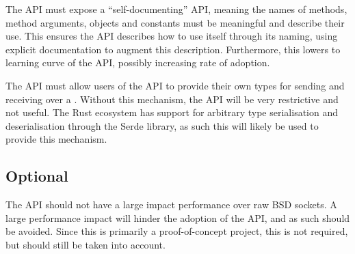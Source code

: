 The API must expose a “self-documenting” API, meaning the names of methods, method arguments, objects and constants must be
meaningful and describe their use.
This ensures the API describes how to use itself through its naming, using explicit documentation to augment this description.
Furthermore, this lowers to learning curve of the API, possibly increasing rate of adoption.

The API must allow users of the API to provide their own types for sending and receiving over a \connection{}.
Without this mechanism, the API will be very restrictive and not useful.
The Rust ecosystem has support for arbitrary type serialisation and deserialisation through the Serde library, as such this
will likely be used to provide this mechanism.

\subsection{Optional}\label{subsec:optional2}

The API should not have a large impact performance over raw BSD sockets.
A large performance impact will hinder the adoption of the API, and as such should be avoided.
Since this is primarily a proof-of-concept project, this is not required, but should still be taken into account.

